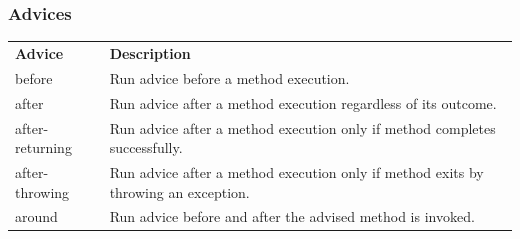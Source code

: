 \documentclass[10pt,xcolor=pdflatex, table]{beamer}
\begin{document}
\begin{frame}\frametitle{Advices}
\begin{footnotesize}
    {\def\arraystretch{2}
    \begin{tabular}{p{5cm} p{5cm}}
    \textbf{Advice} & \textbf{Description}\\
    before & Run advice before a method execution.\\
    after & Run advice after a method execution regardless of its outcome.\\
    after-returning & Run advice after a method execution only if method completes successfully.\\
    after-throwing & Run advice after a method execution only if method exits by throwing an exception.\\
    around & Run advice before and after the advised method is invoked.\\
    \end{tabular}}
\end{footnotesize}
\end{frame}
\end{document}
